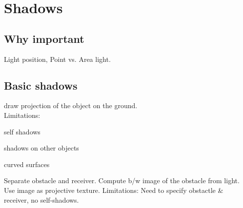 \chapter{Shadows}
\section{Why important}
\begin{compactdesc}
	\item[\lp{depth cue}] 
	\item[\lp{Scene lighting}] Light position, Point vs. Area light.
	\item[\lp{Realism}]
\section{Basic shadows}
	\item[\lp{planar shadows}] draw projection of the object on the ground.\\
		Limitations: \\
		\begin{enumerate*}[label=\protect\circled{\arabic*},itemjoin=]
			\item self shadows\\
			\item shadows on other objects\\
			\item curved surfaces
		\end{enumerate*}
	\item[\lp{projective tetxure shadows}] Separate obstacle and receiver. Compute b/w  image of the obstacle from light. Use image as projective texture. Limitations: Need to specify obstactle \& receiver, no self-shadows.

\end{compactdesc}
